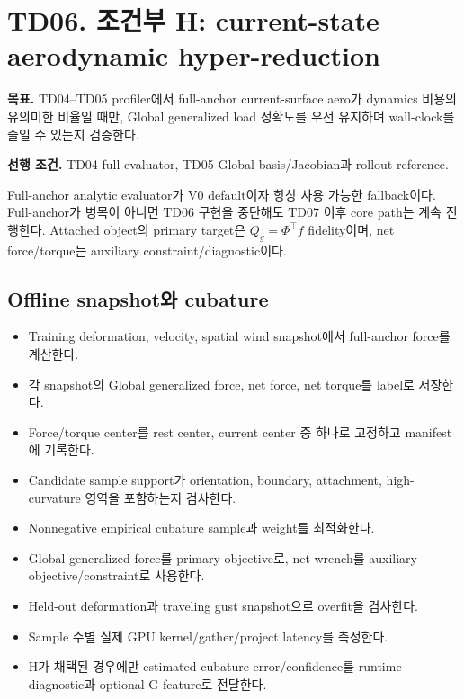 \documentclass[10pt,a4paper]{article}
\newcommand{\todo}{\textcolor{TodoGray}{\(\square\)}}
\begin{document}
\section{TD06. 조건부 H: current-state aerodynamic hyper-reduction}

\textbf{목표.}
TD04--TD05 profiler에서 full-anchor current-surface aero가 dynamics 비용의 유의미한 비율일 때만,
Global generalized load 정확도를 우선 유지하며 wall-clock를 줄일 수 있는지 검증한다.

\textbf{선행 조건.} TD04 full evaluator, TD05 Global basis/Jacobian과 rollout reference.

\begin{tcolorbox}[colback=LightOrange,colframe=orange!60!black,title=H 진입/철회 계약,fonttitle=\bfseries]
Full-anchor analytic evaluator가 V0 default이자 항상 사용 가능한 fallback이다.
Full-anchor가 병목이 아니면 TD06 구현을 중단해도 TD07 이후 core path는 계속 진행한다.
Attached object의 primary target은 \(Q_g=\Phi^\top f\) fidelity이며,
net force/torque는 auxiliary constraint/diagnostic이다.
\end{tcolorbox}

\subsection*{Offline snapshot와 cubature}

\begin{itemize}
  \item[\todo] Training deformation, velocity, spatial wind snapshot에서 full-anchor force를 계산한다.
  \item[\todo] 각 snapshot의 Global generalized force, net force, net torque를 label로 저장한다.
  \item[\todo] Force/torque center를 rest center, current center 중 하나로 고정하고 manifest에 기록한다.
  \item[\todo] Candidate sample support가 orientation, boundary, attachment, high-curvature 영역을 포함하는지 검사한다.
  \item[\todo] Nonnegative empirical cubature sample과 weight를 최적화한다.
  \item[\todo] Global generalized force를 primary objective로, net wrench를 auxiliary objective/constraint로 사용한다.
  \item[\todo] Held-out deformation과 traveling gust snapshot으로 overfit을 검사한다.
  \item[\todo] Sample 수별 실제 GPU kernel/gather/project latency를 측정한다.
  \item[\todo] H가 채택된 경우에만 estimated cubature error/confidence를 runtime diagnostic과 optional G feature로 전달한다.
\end{itemize}
\end{document}
